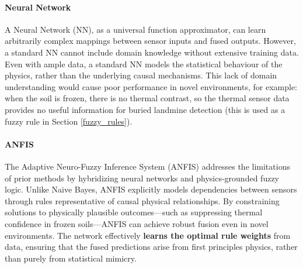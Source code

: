     \paragraph{Neural Network}

        A Neural Network (NN), as a universal function approximator, can learn arbitrarily complex mappings between sensor inputs and fused outputs. However, a standard NN cannot include domain knowledge without extensive training data. Even with ample data, a standard NN models the statistical behaviour of the physics, rather than the underlying causal mechanisms. This lack of domain understanding would cause poor performance in novel environments, for example: when the soil is frozen, there is no thermal contrast, so the thermal sensor data provides no useful information for buried landmine detection (this is used as a fuzzy rule in Section \ref{fuzzy_rules}).


    \paragraph{ANFIS}

        The Adaptive Neuro-Fuzzy Inference System (ANFIS) \cite{jang1993anfis} addresses the limitations of prior methods by hybridizing neural networks and physics-grounded fuzzy logic. Unlike Naive Bayes, ANFIS explicitly models dependencies between sensors through rules representative of causal physical relationships. By constraining solutions to physically plausible outcomes—such as suppressing thermal confidence in frozen soils—ANFIS can achieve robust fusion even in novel environments. The network effectively \textbf{learns the optimal rule weights} from data, ensuring that the fused predictions arise from first principles physics, rather than purely from statistical mimicry.


